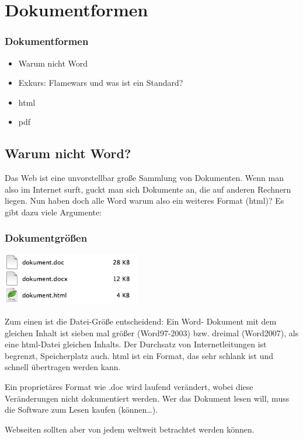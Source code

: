 \section{Dokumentformen}
		\begin{frame}
			\frametitle{Dokumentformen}
			\begin{itemize}
				\item Warum nicht Word
        \item Exkurs: Flamewars und was ist ein Standard?
				\item html
				\item pdf
			\end{itemize}
		\end{frame}

  \subsection{Warum nicht Word?}
  Das Web ist eine unvorstellbar große Sammlung von Dokumenten. Wenn man also im Internet surft, guckt man sich Dokumente an, die auf anderen Rechnern liegen. Nun haben doch alle Word \textendash{} warum also ein weiteres Format (html)? Es gibt dazu viele Argumente: 

  \begin{frame}
    \frametitle<beamer>{Dokumentgrößen}
    \begin{center}
      \includegraphics[width=6cm]{pics/Finder.png}
    \end{center}
  \end{frame}

  Zum einen ist die Datei-Größe entscheidend: Ein Word- Dokument mit dem gleichen Inhalt ist sieben mal größer (Word97-2003) bzw. dreimal (Word2007), als eine html-Datei gleichen Inhalts. Der Durchsatz von Internetleitungen ist begrenzt, Speicherplatz auch. html ist ein Format, das sehr schlank ist und schnell übertragen werden kann. 

  Ein proprietäres Format wie .doc wird laufend verändert, wobei diese Veränderungen nicht dokumentiert werden. Wer das Dokument lesen will, muss die Software zum Lesen kaufen (können\ldots).

  Webseiten sollten aber von jedem weltweit betrachtet werden können. 


